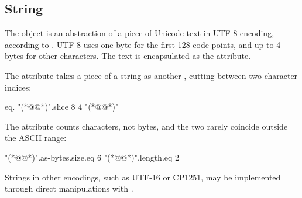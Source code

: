 
\subsection{String}\label{sec:string}

The  object is an abstraction of a piece of
  Unicode text in UTF-8 encoding, according to \citet{unicode}.
UTF-8 uses one byte for the first 128 code points,
  and up to 4 bytes for other characters.
The text is encapsulated as the  attribute.

The  attribute takes a piece of a string as another ,
  cutting between two character indices:

\begin{ffcode}
eq.
  "(*@@*)".slice 8 4
  "(*@@*)"
\end{ffcode}

The  attribute counts characters,
  not bytes, and the two rarely coincide
  outside the ASCII range:

\begin{ffcode}
"(*@@*)".as-bytes.size.eq 6
"(*@@*)".length.eq 2
\end{ffcode}

Strings in other encodings, such as UTF-16 or CP1251,
  may be implemented through direct manipulations with .
